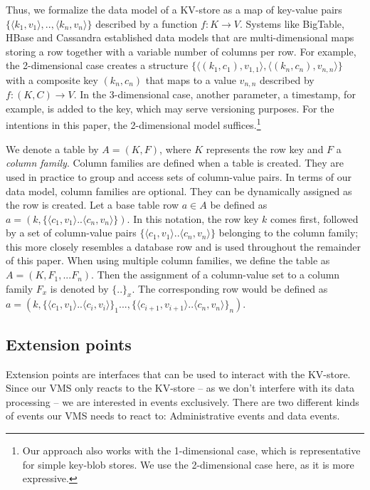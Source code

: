 Thus, we formalize the data model of a KV-store as a map of key-value 
pairs $\{\langle k_1, v_1\rangle,..,\langle k_n,v_n\rangle\}$ described 
by a function $f:K \rightarrow V$. Systems like BigTable, HBase and 
Cassandra established data models that are multi-dimensional maps 
storing a row together with a variable number of columns per row. For 
example, the 2-dimensional case creates a structure 
$\{\langle(k_1,c_1),v_{1,1}\rangle,\langle (k_n,c_n) ,v_{n,n}\rangle\}$ 
with a composite key $(k_n,c_n)$ that maps to a value $v_{n,n}$ 
described by $f:(K,C)\rightarrow V$. In the 3-dimensional case, another 
parameter, a timestamp, for example, is added to the key, which may 
serve versioning purposes. For the intentions in this paper, the 
2-dimensional model suffices.\footnote{Our approach also works with the 
1-dimensional case, which is representative for simple key-blob stores. 
We use the 2-dimensional case here, as it is more expressive.} 

We denote a table by $A = (K, F)$, where $K$ represents the row key and 
$F$ a \textit{column family}. Column families are defined when a table 
is created. They are used in practice to group and access sets of 
column-value pairs. In terms of our data model, column families are 
optional. They can be dynamically assigned as the row is created. Let a 
base table row $a \in A$ be defined as $a=(k,\{\langle 
c_1,v_1\rangle..\langle c_n,v_n\rangle\})$. In this notation, the row 
key $k$ comes first, followed by a set of column-value pairs $\{\langle 
c_1,v_1\rangle..\langle c_n,v_n\rangle\}$ belonging to 
the column family; this more closely resembles a database row and is 
used throughout the remainder of this paper. When using multiple column 
families, we define the table as $A = (K, F_1,...F_n)$. Then the 
assignment of a column-value set to a column family $F_x$ is denoted by 
$\{..\}_x$. The corresponding row would be defined as $a=(k, \{\langle 
c_1,v_1\rangle..\langle c_i, v_i\rangle\}_1..., \{\langle 
c_{i+1},v_{i+1}\rangle.. \langle c_n,v_n\rangle\}_n)$. 



\subsection{Extension points}
Extension points are interfaces that can be used to interact with the
KV-store. Since our VMS only reacts to the KV-store -- as we don't
interfere with its data processing -- we are interested in events
exclusively. There are two different kinds of events our VMS needs 
to react to: Administrative events and data events.

